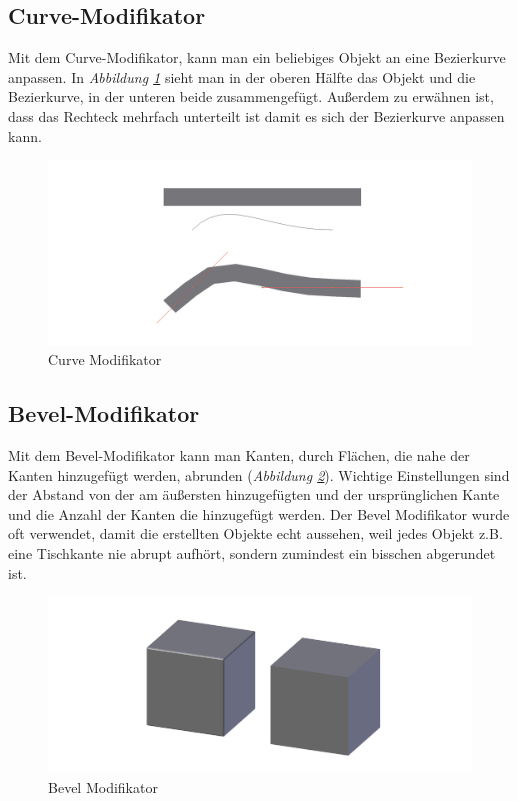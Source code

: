 \subsection{Curve-Modifikator}\citep{blender:curve_modifier}
\label{Curve:heading}
Mit dem Curve-Modifikator, kann man ein beliebiges Objekt an eine Bezierkurve anpassen. In \textit{Abbildung \ref{modifikatoren:image4}} sieht man
in der oberen Hälfte das Objekt und die Bezierkurve, in der unteren beide zusammengefügt.
Außerdem zu erwähnen ist, dass das Rechteck mehrfach unterteilt ist damit es sich der Bezierkurve anpassen kann.
\begin{figure}[h]
    \centering
    \includegraphics[width=.8\textwidth]{images/Modifikatoren-Curve.png}
    \caption{Curve Modifikator}
    \label{modifikatoren:image4}
\end{figure}

\subsection{Bevel-Modifikator}\citep{blender:bevel_modifier}
\label{Bevel:heading}
Mit dem Bevel-Modifikator kann man Kanten, durch Flächen, die nahe der Kanten hinzugefügt werden, abrunden (\textit{Abbildung \ref{modifikatoren:image5}}).
Wichtige Einstellungen sind der Abstand von der am äußersten hinzugefügten und der ursprünglichen Kante und die Anzahl der Kanten die hinzugefügt werden.
Der Bevel Modifikator wurde oft verwendet, damit die erstellten Objekte echt aussehen, weil jedes Objekt z.B. eine Tischkante nie abrupt
aufhört, sondern zumindest ein bisschen abgerundet ist.
\begin{figure}[h]
    \centering
    \includegraphics[width=.8\textwidth]{images/Modifikatoren-Bevel.png}
    \caption{Bevel Modifikator}
    \label{modifikatoren:image5}
\end{figure}

